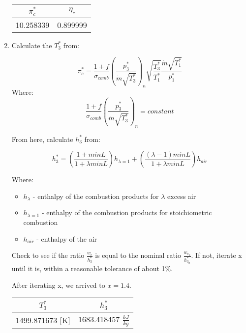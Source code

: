 \documentclass[titlepage]{article}
\begin{document}
\begin{enumerate}
  \begin{center}
    \begin{tabular}{|c|c|}
      \hline
      $\pi_{c}^{*}$ & $\eta_{c}$ \\
      \hline
      10.258339 & 0.899999 \\
      \hline
    \end{tabular}
  \end{center}
  \item Calculate the $T_{3}^{*}$ from:
  
  \begin{equation}
    \pi_{c}^{*} = \frac{1+f}{\sigma_{comb}} \left( \frac{p_{3}^{*}}{\dot{m}\sqrt{T_{3}^{*}}} \right)_{n}
    \sqrt{\frac{T_{3}^{*}}{T_{1}^{*}}} \frac{\dot{m}\sqrt{T_{1}^{*}}}{p_{1}^{*}}
  \end{equation}
  Where:
  \begin{equation}
    \frac{1+f}{\sigma_{comb}} \left( \frac{p_{3}^{*}}{\dot{m}\sqrt{T_{3}^{*}}} \right)_{n} = constant
  \end{equation}
  
  From here, calculate $h_{3}^{*}$ from:

  \begin{equation}
    h_{3}^{*} = \left(\frac{1+minL}{1+\lambda minL}\right) h_{\lambda =1} + \left(\frac{(\lambda -1) minL}{1+\lambda minL}\right) h_{air}
  \end{equation}

  Where:
  \begin{itemize}
    \item $h_{\lambda}$ - enthalpy of the combustion products for $\lambda$ excess air
    \item $h_{\lambda =1}$ - enthalpy of the combustion products for stoichiometric combustion
    \item $h_{air}$ - enthalpy of the air
  \end{itemize}

  Check to see if the ratio $\frac{w_{c}}{h_{3}^{*}}$ is equal to the nominal ratio
  $\frac{w_{c_{n}}}{h_{3_{n}}^{*}}$. If not, iterate x until it is, within a reasonable tolerance of about 1\%.

  \vspace{0.5cm}

  After iterating x, we arrived to $x = 1.4$.

  \begin{center}
    \begin{tabular}{|c|c|}
      \hline
      $T_{3}^{*}$ & $h_{3}^{*}$ \\
      \hline
      1499.871673 [K] & 1683.418457 $\frac{kJ}{kg}$ \\
      \hline
    \end{tabular}
  \end{center}


\end{enumerate}
\end{document}
